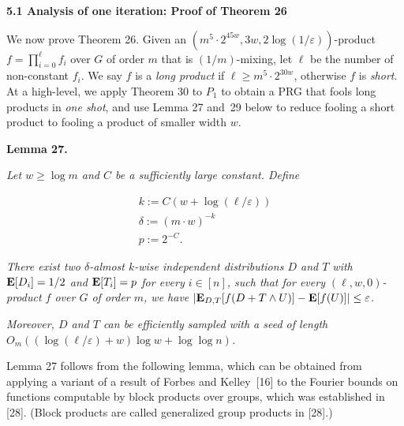 \par\medskip\noindent\textbf{
5.1 Analysis of one iteration: Proof of Theorem 26
}\par




We now prove Theorem 26.
Given an $(m^{5}\cdot 2^{45w},3w,2\log(1/\varepsilon))$-product $f=\prod_{i=0}^{\ell}f_{i}$ over $G$ of order $m$ that is $(1/m)$-mixing, let $\ell$ be the number of non-constant $f_{i}$.
We say $f$ is a \emph{long product} if $\ell\geq m^{5}\cdot 2^{30w}$, otherwise $f$ is \emph{short}.
At a high-level, we apply Theorem 30 to $P_{1}$ to obtain a PRG that fools long products in \emph{one shot}, and use Lemma 27 and 29 below to reduce fooling a short product to fooling a product of smaller width $w$.\par





\par\medskip\noindent\textbf{
\textbf{Lemma 27}\textbf{.}
}\par



\emph{Let $w\geq\log m$ and $C$ be a sufficiently large constant.
Define}\par


\[\begin{gathered}
\displaystyle k \displaystyle:=C(w+\log(\ell/\varepsilon)) \\
\displaystyle\delta \displaystyle:=(m\cdot w)^{-k} \\
\displaystyle p \displaystyle:=2^{-C}.
\end{gathered}\]


\emph{There exist two $\delta$-almost $k$-wise independent distributions $D$ and $T$ with $\mathop{\bf E\/}[D_{i}]=1/2$ and $\mathop{\bf E\/}[T_{i}]=p$ for every $i\in[n]$, such that for every $(\ell,w,0)$-product $f$ over $G$ of order $m$, we have $\lvert\mathop{\bf E\/}_{D,T}[f(D+T\wedge U)]-\mathop{\bf E\/}[f(U)]\rvert\leq\varepsilon$.}\par




\emph{Moreover, $D$ and $T$ can be efficiently sampled with a seed of length $O_{m}((\log(\ell/\varepsilon)+w)\log w+\log\log n)$.}\par






Lemma 27 follows from the following lemma, which can be obtained from applying a variant of a result of Forbes and Kelley [16] to the Fourier bounds on functions computable by block products over groups, which was established in [28].
(Block products are called generalized group products in [28].)\par




